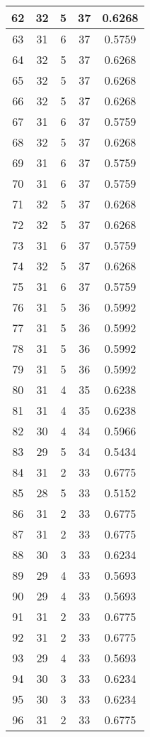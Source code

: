 \documentclass[letterpaper, 12pt]{article}
\begin{document}
\begin{longtable}{|c|c|c|c|c|}
\hline
62 & 32 & 5 & 37 & 0.6268 \\
\hline
63 & 31 & 6 & 37 & 0.5759 \\
\hline
64 & 32 & 5 & 37 & 0.6268 \\
\hline
65 & 32 & 5 & 37 & 0.6268 \\
\hline
66 & 32 & 5 & 37 & 0.6268 \\
\hline
67 & 31 & 6 & 37 & 0.5759 \\
\hline
68 & 32 & 5 & 37 & 0.6268 \\
\hline
69 & 31 & 6 & 37 & 0.5759 \\
\hline
70 & 31 & 6 & 37 & 0.5759 \\
\hline
71 & 32 & 5 & 37 & 0.6268 \\
\hline
72 & 32 & 5 & 37 & 0.6268 \\
\hline
73 & 31 & 6 & 37 & 0.5759 \\
\hline
74 & 32 & 5 & 37 & 0.6268 \\
\hline
75 & 31 & 6 & 37 & 0.5759 \\
\hline
76 & 31 & 5 & 36 & 0.5992 \\
\hline
77 & 31 & 5 & 36 & 0.5992 \\
\hline
78 & 31 & 5 & 36 & 0.5992 \\
\hline
79 & 31 & 5 & 36 & 0.5992 \\
\hline
80 & 31 & 4 & 35 & 0.6238 \\
\hline
81 & 31 & 4 & 35 & 0.6238 \\
\hline
82 & 30 & 4 & 34 & 0.5966 \\
\hline
83 & 29 & 5 & 34 & 0.5434 \\
\hline
84 & 31 & 2 & 33 & 0.6775 \\
\hline
85 & 28 & 5 & 33 & 0.5152 \\
\hline
86 & 31 & 2 & 33 & 0.6775 \\
\hline
87 & 31 & 2 & 33 & 0.6775 \\
\hline
88 & 30 & 3 & 33 & 0.6234 \\
\hline
89 & 29 & 4 & 33 & 0.5693 \\
\hline
90 & 29 & 4 & 33 & 0.5693 \\
\hline
91 & 31 & 2 & 33 & 0.6775 \\
\hline
92 & 31 & 2 & 33 & 0.6775 \\
\hline
93 & 29 & 4 & 33 & 0.5693 \\
\hline
94 & 30 & 3 & 33 & 0.6234 \\
\hline
95 & 30 & 3 & 33 & 0.6234 \\
\hline
96 & 31 & 2 & 33 & 0.6775 \\

\end{longtable}
\end{document}
